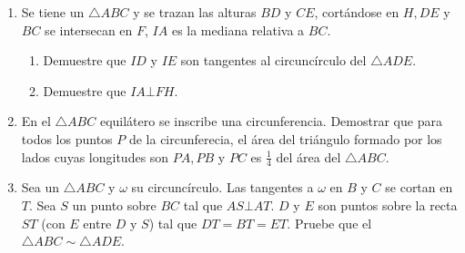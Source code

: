 \documentclass{book}
\begin{document}
\begin{enumerate}
        \item Se tiene un $\triangle ABC$ y se trazan las alturas $BD$ y $CE$, cortándose en $H,DE$ y $BC$ se intersecan en $F$, $IA$ es la mediana relativa a $BC$.
        \begin{enumerate}
            \item Demuestre que $ID$ y $IE$ son tangentes al circuncírculo del $\triangle ADE$.
            \item Demuestre que $IA \bot FH$.
        \end{enumerate}
        \item En el $\triangle ABC$ equilátero se inscribe una circunferencia. Demostrar que para todos los puntos $P$ de la circunferecia, el área del triángulo formado por los lados cuyas longitudes son $PA, PB$ y $PC$ es $\displaystyle{\frac{1}{4}}$ del área del $\triangle ABC$.
        \item Sea un $\triangle ABC$ y $\omega$ su circuncírculo. Las tangentes a $\omega$ en $B$ y $C$ se cortan en $T$. Sea $S$ un punto sobre $BC$ tal que $AS \bot AT$. $D$ y $E$ son puntos sobre la recta $ST$ (con $E$ entre $D$ y $S$) tal que $DT = BT =ET$. Pruebe que el $\triangle ABC\sim\triangle ADE$.
    \end{enumerate}
    \newpage
\end{document}
